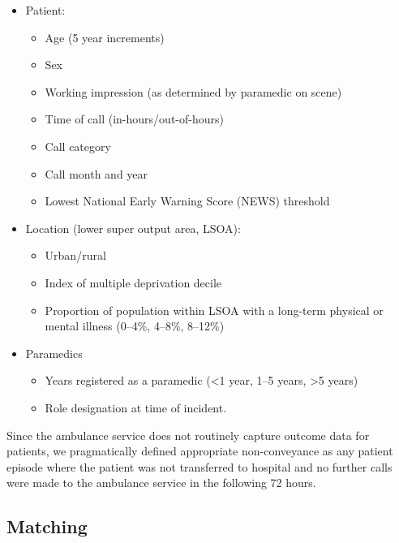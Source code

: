 \documentclass[
  a4paper,
  openany]{article}
\providecommand{\tightlist}{%
  \setlength{\itemsep}{0pt}\setlength{\parskip}{0pt}}
\begin{document}
\begin{itemize}
\tightlist
\item
  Patient:

  \begin{itemize}
  \tightlist
  \item
    Age (5 year increments)
  \item
    Sex
  \item
    Working impression (as determined by paramedic on scene)
  \item
    Time of call (in-hours/out-of-hours)
  \item
    Call category
  \item
    Call month and year
  \item
    Lowest National Early Warning Score (NEWS) threshold
  \end{itemize}
\item
  Location (lower super output area, LSOA):

  \begin{itemize}
  \tightlist
  \item
    Urban/rural
  \item
    Index of multiple deprivation decile
  \item
    Proportion of population within LSOA with a long-term physical or mental illness (0--4\%, 4--8\%, 8--12\%)
  \end{itemize}
\item
  Paramedics

  \begin{itemize}
  \tightlist
  \item
    Years registered as a paramedic (\textless1 year, 1--5 years, \textgreater5 years)
  \item
    Role designation at time of incident.
  \end{itemize}
\end{itemize}

Since the ambulance service does not routinely capture outcome data for patients, we pragmatically defined appropriate non-conveyance as any patient episode where the patient was not transferred to hospital and no further calls were made to the ambulance service in the following 72 hours.

\hypertarget{matching}{%
\subsection*{Matching}\label{matching}}
\end{document}

